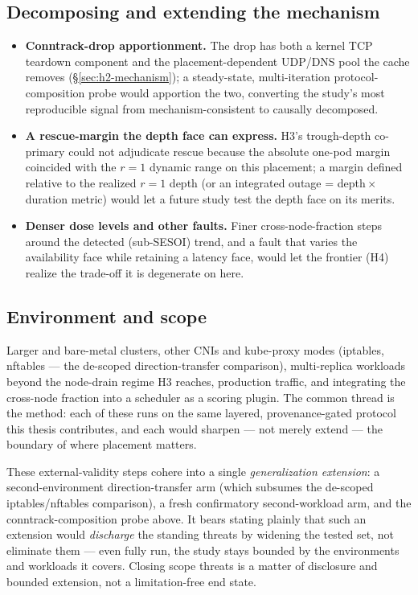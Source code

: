 \subsection*{Decomposing and extending the mechanism}

\begin{itemize}
\item \textbf{Conntrack-drop apportionment.} The drop has both a kernel TCP
  teardown component and the placement-dependent UDP/DNS pool the cache removes
  (\S\ref{sec:h2-mechanism}); a steady-state, multi-iteration protocol-composition
  probe would apportion the two, converting the study's most reproducible signal
  from mechanism-consistent to causally decomposed.
\item \textbf{A rescue-margin the depth face can express.} H3's trough-depth
  co-primary could not adjudicate rescue because the absolute one-pod
  margin coincided with the $r{=}1$ dynamic range on this placement; a margin
  defined relative to the realized $r{=}1$ depth (or an integrated outage =
  depth\,$\times$\,duration metric) would let a future study test the
  depth face on its merits.
\item \textbf{Denser dose levels and other faults.} Finer cross-node-fraction
  steps around the detected (sub-SESOI) trend, and a fault that varies the
  availability face while retaining a latency face, would let the frontier (H4)
  realize the trade-off it is degenerate on here.
\end{itemize}

\subsection*{Environment and scope}

Larger and bare-metal clusters, other CNIs and kube-proxy modes (iptables,
nftables --- the de-scoped direction-transfer comparison), multi-replica
workloads beyond the node-drain regime H3 reaches, production traffic, and
integrating the cross-node fraction into a scheduler as a scoring plugin. The
common thread is the method: each of these runs on the same layered,
provenance-gated protocol this thesis contributes, and each
would sharpen --- not merely extend --- the boundary of where placement matters.

These external-validity steps cohere into a single \emph{generalization
extension}: a second-environment direction-transfer arm (which
subsumes the de-scoped iptables/nftables comparison), a fresh confirmatory
second-workload arm, and the conntrack-composition probe above. It bears stating
plainly that such an extension would \emph{discharge} the standing threats by
widening the tested set, not eliminate them --- even fully run, the study stays
bounded by the environments and workloads it covers. Closing scope threats is a
matter of disclosure and bounded extension, not a limitation-free end state.
